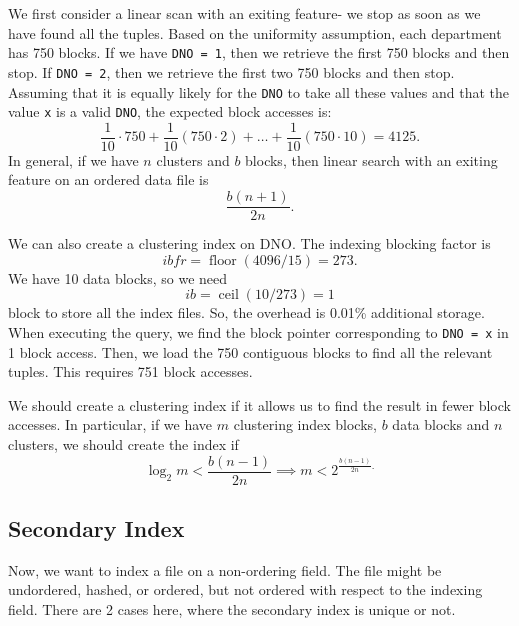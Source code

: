 \documentclass[a4paper, openany]{memoir}
\begin{document}
We first consider a linear scan with an exiting feature- we stop as soon as we have found all the tuples. Based on the uniformity assumption, each department has 750 blocks. If we have \texttt{DNO = 1}, then we retrieve the first 750 blocks and then stop. If \texttt{DNO = 2}, then we retrieve the first two 750 blocks and then stop. Assuming that it is equally likely for the \texttt{DNO} to take all these values and that the value \texttt{x} is a valid \texttt{DNO}, the expected block accesses is:
\[\frac{1}{10} \cdot 750 + \frac{1}{10} (750 \cdot 2) + \dots + \frac{1}{10} (750 \cdot 10) = 4125.\]
In general, if we have $n$ clusters and $b$ blocks, then linear search with an exiting feature on an ordered data file is
\[\frac{b(n+1)}{2n}.\]

We can also create a clustering index on DNO. The indexing blocking factor is
\[\textit{ibfr} = \operatorname{floor}(4096/15) = 273.\]
We have 10 data blocks, so we need
\[\textit{ib} = \operatorname{ceil}(10/273) = 1\]
block to store all the index files. So, the overhead is 0.01\% additional storage. When executing the query, we find the block pointer corresponding to \texttt{DNO = x} in 1 block access. Then, we load the 750 contiguous blocks to find all the relevant tuples. This requires 751 block accesses.

We should create a clustering index if it allows us to find the result in fewer block accesses. In particular, if we have $m$ clustering index blocks, $b$ data blocks and $n$ clusters, we should create the index if
\[\log_2 m <  \frac{b(n-1)}{2n} \implies m < 2^{\frac{b(n-1)}{2n}.}\]


\subsection{Secondary Index}
Now, we want to index a file on a non-ordering field. The file might be undordered, hashed, or ordered, but not ordered with respect to the indexing field. There are 2 cases here, where the secondary index is unique or not.
\end{document}
